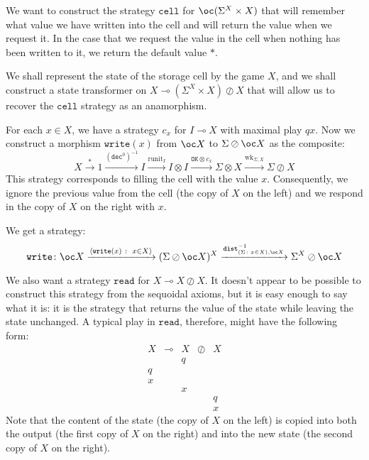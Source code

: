 \documentclass[a4paper,UKenglish]{lipics-v2016}
\theoremstyle{plain}
\theoremstyle{definition}
\newcommand*\from{\colon}
\def \inv {^{-1}}
\newcommand{\tensor}{\otimes}
\newcommand{\sequoid}{\oslash}
\renewcommand{\implies}{\multimap}
\newcommand{\suchthat}{\;\colon\;}
\DeclareMathOperator{\runit}{runit}
\DeclareMathOperator{\wk}{wk}
\newcommand{\dist}{{\mathtt{dist}}}
\newcommand{\dec}{{\mathtt{dec}}}
\newcommand{\OK}{{\mathtt{OK}}}
\newcommand{\cell}{{\mathtt{cell}}}
\renewcommand{\read}{{\mathtt{read}}}
\newcommand{\wwrite}{{\mathtt{write}}}
\newlength{\arrow}
\begin{document}
We want to construct the strategy $\cell$ for $\oc(\Sigma^X\times X)$ that will remember what value we have written into the cell and will return the value when we request it.  In the case that we request the value in the cell when nothing has been written to it, we return the default value $*$.

We shall represent the state of the storage cell by the game $X$, and we shall construct a state transformer on $X \implies (\Sigma^X\times X)\sequoid X$ that will allow us to recover the $\cell$ strategy as an anamorphism.  

For each $x\in X$, we have a strategy $c_x$ for $I\implies X$ with maximal play $qx$.  Now we construct a morphism $\wwrite(x)$ from $\oc X$ to $\Sigma\sequoid\oc X$ as the composite:
\[
  X \xrightarrow{*} 1 \xrightarrow{{(\dec^0)}\inv} I \xrightarrow{\runit_I} I \tensor I \xrightarrow{\OK\tensor c_x} \Sigma \tensor X \xrightarrow{\wk_{\Sigma,X}} \Sigma \sequoid X
  \]
This strategy corresponds to filling the cell with the value $x$.  Consequently, we ignore the previous value from the cell (the copy of $X$ on the left) and we respond in the copy of $X$ on the right with $x$.

We get a strategy:
\[
  \wwrite \from \oc X \xrightarrow{\langle \wwrite(x)\suchthat x\in X\rangle} (\Sigma \sequoid \oc X)^X \xrightarrow{\dist_{(\Sigma\colon x\in X),\oc X}\inv} \Sigma^X\sequoid\oc X
  \]

We also want a strategy $\read$ for $X \implies X \sequoid X$.  It doesn't appear to be possible to construct this strategy from the sequoidal axioms, but it is easy enough to say what it is: it is the strategy that returns the value of the state while leaving the state unchanged.  A typical play in $\read$, therefore, might have the following form:
\[
  \begin{array}{ccccc}
    X & \implies & X & \sequoid & X \\
    && q && \\
    q &&&& \\
    x &&&& \\
    && x && \\
    &&&& q \\
    &&&& x
  \end{array}
  \]
Note that the content of the state (the copy of $X$ on the left) is copied into both the output (the first copy of $X$ on the right) and into the new state (the second copy of $X$ on the right).  
\end{document}
